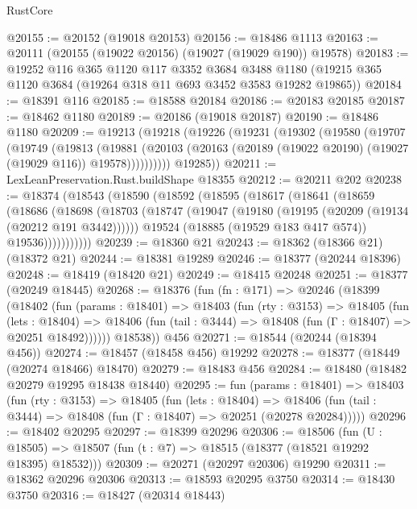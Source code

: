 \begin{lexlean}{RustCore}
\begin{coremodule}
@20155 := @20152 (@19018 @20153)
@20156 := @18486 @1113
@20163 := @20111 (@20155 (@19022 @20156) (@19027 (@19029 @190)) @19578)
@20183 := @19252
    @116
    @365
    @1120
    @117
    @3352
    @3684
    @3488
    @1180
    (@19215 @365 @1120 @3684 (@19264 @318 @11 @693 @3452 @3583 @19282 @19865))
@20184 := @18391 @116
@20185 := @18588 @20184
@20186 := @20183 @20185
@20187 := @18462 @1180
@20189 := @20186 (@19018 @20187)
@20190 := @18486 @1180
@20209 := @19213
    (@19218
      (@19226
        (@19231
          (@19302
            (@19580
              (@19707
                (@19749
                  (@19813
                    (@19881
                      (@20103
                        (@20163 (@20189 (@19022 @20190) (@19027 (@19029 @116)) @19578))))))))))
        @19285))
@20211 := LexLeanPreservation.Rust.buildShape @18355
@20212 := @20211 @202
@20238 := @18374
    (@18543
      (@18590
        (@18592
          (@18595
            (@18617
              (@18641
                (@18659
                  (@18686
                    (@18698
                      (@18703
                        (@18747
                          (@19047 (@19180 (@19195 (@20209 (@19134 (@20212 @191 @3442))))))
                          @19524
                          (@18885 (@19529 @183 @417 @574))
                          @19536)))))))))))
@20239 := @18360 @21
@20243 := @18362 (@18366 @21) (@18372 @21)
@20244 := @18381 @19289
@20246 := @18377 (@20244 @18396)
@20248 := @18419 (@18420 @21)
@20249 := @18415 @20248
@20251 := @18377 (@20249 @18445)
@20268 := @18376
    (fun (fn : @171) =>
    @20246
      (@18399
        (@18402
          (fun (params : @18401) =>
          @18403
            (fun (rty : @3153) =>
            @18405
              (fun (lets : @18404) =>
              @18406 (fun (tail : @3444) => @18408 (fun (Γ : @18407) => @20251 @18492))))))
        @18538))
    @456
@20271 := @18544 (@20244 (@18394 @456))
@20274 := @18457 (@18458 @456) @19292
@20278 := @18377 (@18449 (@20274 @18466) @18470)
@20279 := @18483 @456
@20284 := @18480 (@18482 @20279 @19295 @18438 @18440)
@20295 := fun (params : @18401) =>
  @18403
    (fun (rty : @3153) =>
    @18405
      (fun (lets : @18404) =>
      @18406 (fun (tail : @3444) => @18408 (fun (Γ : @18407) => @20251 (@20278 @20284)))))
@20296 := @18402 @20295
@20297 := @18399 @20296
@20306 := @18506
    (fun (U : @18505) => @18507 (fun (t : @7) => @18515 (@18377 (@18521 @19292 @18395) @18532)))
@20309 := @20271 (@20297 @20306) @19290
@20311 := @18362 @20296 @20306
@20313 := @18593 @20295 @3750
@20314 := @18430 @3750
@20316 := @18427 (@20314 @18443)

\end{coremodule}
\end{lexlean}
